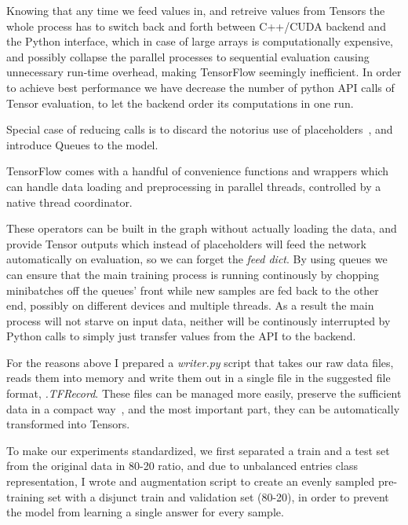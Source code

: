 Knowing that any time we feed values in, and retreive values from Tensors the whole process has to switch back and forth between C++/CUDA backend and the Python interface, which in case of large arrays is computationally expensive, and possibly collapse the parallel processes to sequential evaluation causing unnecessary run-time overhead, making TensorFlow seemingly inefficient.
In order to achieve best performance we have decrease the number of python API calls of Tensor evaluation, to let the backend order its computations in one run.

Special case of reducing calls is to discard the notorius use of placeholders~\cite{placeholder-remove-MEDIUM-blog}, and introduce Queues to the model.

TensorFlow comes with a handful of convenience functions and wrappers which can handle data loading and preprocessing in parallel threads, controlled by a native thread coordinator.

These operators can be built in the graph without actually loading the data, and provide Tensor outputs which instead of placeholders will feed the network automatically on evaluation, so we can forget the \textit{feed dict}.
By using queues we can ensure that the main training process is running continously by chopping minibatches off the queues' front while new samples are fed back to the other end, possibly on different devices and multiple threads.
As a result the main process will not starve on input data, neither will be continously interrupted by Python calls to simply just transfer values from the API to the backend.

For the reasons above I prepared a \textit{writer.py} script that takes our raw data files, reads them into memory and write them out in a single file in the suggested file format, \textit{.TFRecord}.
These files can be managed more easily, preserve the sufficient data in a compact way~\cite{tf-records-howto}, and the most important part, they can be automatically transformed into Tensors.

To make our experiments standardized, we first separated a train and a test set from the original data in 80-20 ratio, and due to unbalanced entries class representation, I wrote and augmentation script to create an evenly sampled pre-training set with a disjunct train and validation set (80-20), in order to prevent the model from learning a single answer for every sample.

